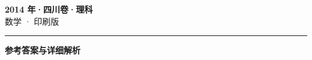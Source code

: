 \documentclass[zihao=5, a4paper]{ctexart}
\begin{document}
\begin{center}
  {\Large\bfseries 2014 年·四川卷·理科}\\[4pt]
  {\large 数学 · 印刷版}
\end{center}
\medskip
{}

\par\bigskip\hrule\bigskip
{}
\Needspace{0.55\textheight}
\begin{center}{\large\bfseries 参考答案与详细解析}\end{center}
\smallskip

\end{document}
